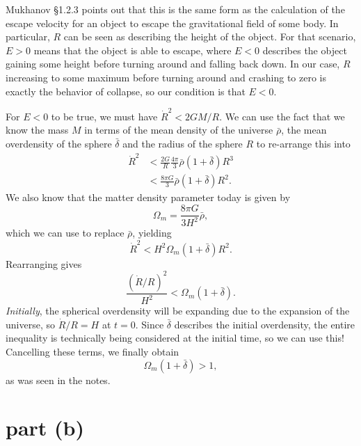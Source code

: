 \documentclass{article}
\begin{document}
Mukhanov \S 1.2.3 points out that this is the same form as the calculation
of the escape velocity for an object to escape the gravitational field of some
body. In particular, $R$ can be seen as describing the height of the object.
For that scenario, $E > 0$ means that the object is able to escape, where $E <
0$ describes the object gaining some height before turning around and falling
back down. In our case, $R$ increasing to some maximum before turning around
and crashing to zero is exactly the behavior of collapse, so our condition is
that $E < 0$.

For $E < 0$ to be true, we must have $\dot R^2 < 2 G M / R$. We can use the fact
that we know the mass $M$ in terms of the mean density of the universe $\bar
\rho$, the mean overdensity of the sphere $\bar \delta$ and the radius of the
sphere $R$ to re-arrange this into
\begin{equation}
	\begin{aligned}
	\dot R^2
	&< \frac{2 G}{R} \frac{4 \pi}{3} \bar\rho \left(1 + \bar\delta\right) R^3 \\
	&< \frac{8 \pi G}{3} \bar\rho \left(1 + \bar\delta\right) R^2.
	\end{aligned}
\end{equation}
We also know that the matter density parameter today is given by
\begin{equation}
	\Omega_m = \frac{8 \pi G}{3 H^2} \bar \rho,
\end{equation}
which we can use to replace $\bar \rho$, yielding
\begin{equation}
	\dot R^2 < H^2 \Omega_m \left(1 + \bar\delta\right) R^2.
\end{equation}
Rearranging gives
\begin{equation}
	\frac{(\dot R / R)^2}{H^2} < \Omega_m \left(1 + \bar\delta\right).
\end{equation}
\textit{Initially}, the spherical overdensity will be expanding due to the
expansion of the universe, so $\dot R / R = H$ at $t = 0$. Since $\bar\delta$
describes the initial overdensity, the entire inequality is technically being
considered at the initial time, so we can use this! Cancelling these terms, we
finally obtain
\begin{equation}
	\Omega_m \left(1 + \bar\delta\right) > 1,
\end{equation}
as was seen in the notes.


\section*{part (b)}
\end{document}
